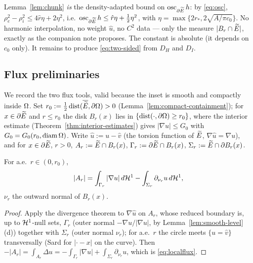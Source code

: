 \begin{remark}\label{rem:adapted}
Lemma~\ref{lem:chunk} \emph{is} the density-adapted bound on
$\operatorname{osc}_{\partial\widetilde E}h$: by \eqref{eq:osc},
$\rho_e^2-\rho_i^2\le 4\hat r\eta+2\eta^2$, i.e.\
$\operatorname{osc}_{\partial\widetilde E}h\le \hat r\eta+\tfrac12\eta^2$, with
$\eta=\max\{2r_*,2\sqrt{A/\pi c_0}\}$. No harmonic interpolation, no weight
$\hat u$, no $C^2$ data --- only the measure $|B_r\cap\widetilde E|$, exactly as
the companion note proposes. The constant is absolute (it depends on $c_0$
only). It remains to produce \eqref{eq:two-sided} from $D_H$ and $D_I$.
\end{remark}

\subsection{Flux preliminaries}\label{ss:flux}

We record the two flux tools, valid because the inset is smooth and
compactly inside $\Omega$. Set
$r_0:=\tfrac12\operatorname{dist}(\overline{\widetilde E},\partial\Omega)>0$
(Lemma~\ref{lem:compact-containment}); for $x\in\partial\widetilde E$ and
$r\le r_0$ the disk $B_r(x)$ lies in $\{\operatorname{dist}(\cdot,
\partial\Omega)\ge r_0\}$, where the interior estimate
(Theorem~\ref{thm:interior-estimates}) gives $|\nabla u|\le G_0$ with
$G_0=G_0(r_0,\operatorname{diam}\Omega)$. Write $\hat u:=u-\hat v$ (the torsion
function of $\widetilde E$, $\nabla\hat u=\nabla u$), and for $x\in\partial\widetilde E$,
$r>0$, $A_r:=\widetilde E\cap B_r(x)$, $\Gamma_r:=\partial\widetilde E\cap B_r(x)$,
$\Sigma_r:=\widetilde E\cap\partial B_r(x)$.

\begin{lemma}\label{lem:localflux}
For a.e.\ $r\in(0,r_0)$,
\begin{equation}\label{eq:localflux}
   |A_r|=\int_{\Gamma_r}|\nabla u|\,d\mathcal{H}^1
        -\int_{\Sigma_r}\partial_{\nu_r}u\,d\mathcal{H}^1,
\end{equation}
$\nu_r$ the outward normal of $B_r(x)$.
\end{lemma}

\begin{proof}
Apply the divergence theorem to $\nabla\hat u$ on $A_r$, whose reduced
boundary is, up to $\mathcal{H}^1$-null sets, $\Gamma_r$ (outer normal
$-\nabla u/|\nabla u|$, by Lemma~\ref{lem:smooth-level}(d)) together with
$\Sigma_r$ (outer normal $\nu_r$); for a.e.\ $r$ the circle meets
$\{u=\hat v\}$ transversally (Sard for $|\cdot-x|$ on the curve). Then
$-|A_r|=\int_{A_r}\Delta u=-\int_{\Gamma_r}|\nabla u|
+\int_{\Sigma_r}\partial_{\nu_r}u$, which is \eqref{eq:localflux}.
\end{proof}

